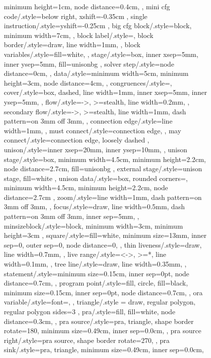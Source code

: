 \documentclass[acmsmall,authorversion,nonacm]{acmart}
\begin{document}
\begin{figure}
{{{{    minimum height=1cm,
    node distance=0.4cm,
  },
  mini cfg code/.style={below right,
    xshift=-0.35cm
  },
  single instruction/.style={yshift=-0.25cm
  },
  big cfg block/.style={block,
    minimum width=7cm,
  },
  block label/.style={},
  block border/.style={draw,
    line width=1mm,
  },
  block variables/.style={fill=white,
  },
  stage/.style={box,
    inner xsep=5mm,
    inner ysep=5mm,
    fill=unisonbg
  },
  solver step/.style={node distance=0cm,
  },
  data/.style={minimum width=5cm,
    minimum height=3cm,
    node distance=4cm,
  },
  congruences/.style={},
  cover/.style={box,
    dashed,
    line width=1mm,
    inner xsep=5mm,
    inner ysep=5mm,
  },
  flow/.style={->,
    >=stealth,
    line width=0.2mm,
  },
  secondary flow/.style={->,
    >=stealth,
    line width=1mm,
    dash pattern=on 3mm off 3mm,
  },
  connection edge/.style={line width=1mm,
  },
  must connect/.style={connection edge,
  },
  may connect/.style={connection edge,
    loosely dashed
  },
  unison/.style={inner xsep=20mm,
    inner ysep=10mm,
  },
  unison stage/.style={box,
    minimum width=4.5cm,
    minimum height=2.2cm,
    node distance=2.7cm,
    fill=unisonbg
  },
  external stage/.style={unison stage,
    fill=white
  },
  unison data/.style={box,
    rounded corners=\cornerRadius,
    minimum width=4.5cm,
    minimum height=2.2cm,
    node distance=2.7cm
  },
  zoom/.style={line width=1mm,
    dash pattern=on 3mm off 3mm,
  },
  focus/.style={draw,
    line width=0.5mm,
    dash pattern=on 3mm off 3mm,
    inner sep=5mm,
  },
  minsizeblock/.style={block,
    minimum width=3cm,
    minimum height=3cm
  },
  square/.style={fill=white,
    minimum size=13mm,
    inner sep=0,
    outer sep=0,
    node distance=0,
  },
  thin liveness/.style={draw,
    line width=0.7mm,
  },
  live range/.style={<->,
      >=*,
      line width=0.1mm,
    },
  tree line/.style={draw,
    line width=0.35mm,
  },
  statement/.style={minimum size=0.15cm,
    inner sep=0pt,
    node distance=0.7cm,
  },
  program point/.style={fill,
    circle,
    fill=black,
    minimum size=0.15cm,
    inner sep=0pt,
    node distance=0.7cm,
  },
  ora variable/.style={font=\small,
  },
  triangle/.style = {draw, regular polygon, regular polygon sides=3 },
  pra/.style={fill,
    fill=white,
    node distance=0.3cm,
  },
  pra source/.style={pra,
    triangle,
    shape border rotate=180,
    minimum size=0.49cm,
    inner sep=0.0cm,
  },
  pra source right/.style={pra source,
    shape border rotate=270,
  },
  pra sink/.style={pra,
    triangle,
    minimum size=0.49cm,
    inner sep=0.0cm,
}}}}
\end{figure}
\end{document}
